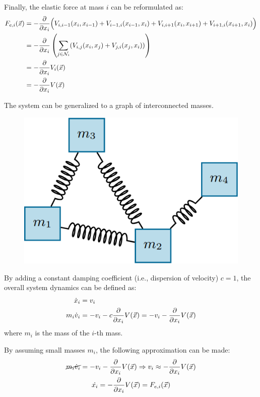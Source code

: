 \begin{description}
        Finally, the elastic force at mass $i$ can be reformulated as:
        \[
            \begin{split}
                F_{e,i}({\vec{x}}) 
                &= - \frac{\partial}{\partial x_i} \Big( V_{i,i-1}(x_i, x_{i-1}) + V_{i-1,i}(x_{i-1}, x_i) + V_{i,i+1}(x_i, x_{i+1}) + V_{i+1,i}(x_{i+1}, x_i) \Big) \\
                &= - \frac{\partial}{\partial x_i} \left( \sum_{j \in \mathcal{N}_i} ( V_{i,j}(x_i, x_j) + V_{j,i}(x_j, x_i) ) \right) \\
                &= - \frac{\partial}{\partial x_i} V_i({\vec{x}}) \\
                &= - \frac{\partial}{\partial x_i} V({\vec{x}})
            \end{split}
        \]

        \begin{remark}
            The system can be generalized to a graph of interconnected masses.

            \begin{figure}[H]
                \centering
                \includegraphics[width=0.3\linewidth]{./img/mass_spring_system3.png}
            \end{figure}
        \end{remark}
        
        By adding a constant damping coefficient (i.e., dispersion of velocity) $c=1$, the overall system dynamics can be defined as:
        \[
            \begin{split}
                \dot{x}_i &= v_i \\
                m_i \dot{v}_i &= - v_i - c\frac{\partial}{\partial x_i} V({\vec{x}}) = - v_i - \frac{\partial}{\partial x_i} V({\vec{x}})
            \end{split}
        \]
        where $m_i$ is the mass of the $i$-th mass.

        By assuming small masses $m_i$, the following approximation can be made:
        \[
            \begin{gathered}
                \cancel{m_i \dot{v}_i} = - v_i - \frac{\partial}{\partial x_i} V({\vec{x}}) \Rightarrow v_i \approx -\frac{\partial}{\partial x_i} V({\vec{x}}) \\
                \dot{x_i} = -\frac{\partial}{\partial x_i} V({\vec{x}}) = F_{e,i}({\vec{x}})
            \end{gathered}
        \]


\end{description}
